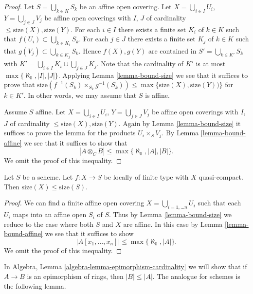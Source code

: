 \begin{proof}
Let $S = \bigcup_{k \in K} S_k$ be an affine open covering.
Let $X = \bigcup_{i \in I} U_i$, $Y = \bigcup_{j \in J} V_j$
be affine open coverings with $I$, $J$ of cardinality
$\leq \text{size}(X), \text{size}(Y)$.
For each $i \in I$ there exists a finite set $K_i$ of $k \in K$
such that $f(U_i) \subset \bigcup_{k \in K_i} S_k$.
For each $j \in J$ there exists a finite set $K_j$ of $k \in K$
such that $g(V_j) \subset \bigcup_{k \in K_j} S_k$.
Hence $f(X), g(Y)$ are contained in
$S' = \bigcup_{k \in K'} S_k$ with
$K' = \bigcup_{i \in I} K_i \cup \bigcup_{j \in J} K_j$.
Note that the cardinality of $K'$
is at most $\max\{\aleph_0, |I|, |J|\}$. Applying
Lemma \ref{lemma-bound-size}
we see that it suffices to prove that
$\text{size}(f^{-1}(S_k) \times_{S_k} g^{-1}(S_k))
\leq \max\{\text{size}(X), \text{size}(Y))\}$ for $k \in K'$.
In other words, we may assume that $S$ is affine.

\medskip\noindent
Assume $S$ affine.
Let $X = \bigcup_{i \in I} U_i$, $Y = \bigcup_{j \in J} V_j$
be affine open coverings with $I$, $J$ of cardinality
$\leq \text{size}(X), \text{size}(Y)$. 
Again by 
Lemma \ref{lemma-bound-size}
it suffices to prove the lemma for the products
$U_i \times_S V_j$. By
Lemma \ref{lemma-bound-affine}
we see that it suffices to show that
$$
|A \otimes_C B| \leq \max\{\aleph_0, |A|, |B|\}.
$$
We omit the proof of this inequality.
\end{proof}

\begin{lemma}
\label{lemma-bound-finite-type}
Let $S$ be a scheme.
Let $f : X \to S$ be locally of finite type with $X$ quasi-compact.
Then $\text{size}(X) \leq \text{size}(S)$.
\end{lemma}

\begin{proof}
We can find a finite affine open covering $X = \bigcup_{i = 1, \ldots n} U_i$
such that each $U_i$ maps into an affine open $S_i$ of $S$. Thus by
Lemma \ref{lemma-bound-size}
we reduce to the case where both $S$ and $X$ are affine. In this case by
Lemma \ref{lemma-bound-affine}
we see that it suffices to show
$$
|A[x_1, \ldots, x_n]| \leq \max\{\aleph_0, |A|\}.
$$
We omit the proof of this inequality.
\end{proof}

\noindent
In
Algebra, Lemma \ref{algebra-lemma-epimorphism-cardinality}
we will show that if $A \to B$ is an epimorphism of rings, then
$|B| \leq |A|$. The analogue for schemes is the following lemma.

